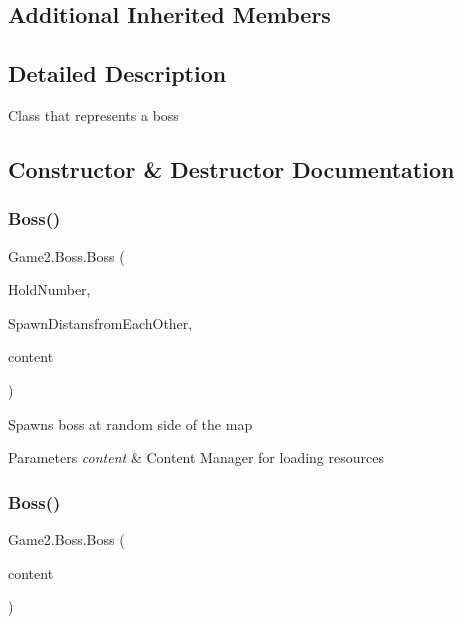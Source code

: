 \subsection*{Additional Inherited Members}


\subsection{Detailed Description}
Class that represents a boss 



\subsection{Constructor \& Destructor Documentation}
\mbox{\label{class_game2_1_1_boss_ae7aa8e138bbf3cc4ced004d6ef1f82df}} 
\subsubsection{\texorpdfstring{Boss()}{Boss()}\hspace{0.1cm}{\footnotesize\ttfamily [1/2]}}
{\footnotesize\ttfamily Game2.\+Boss.\+Boss (\begin{DoxyParamCaption}\item[{int}]{Hold\+Number,  }\item[{int}]{Spawn\+Distansfrom\+Each\+Other,  }\item[{Content\+Manager}]{content }\end{DoxyParamCaption})}



Spawns boss at random side of the map 


\begin{DoxyParams}{Parameters}
{\em content} & Content Manager for loading resources\\
\hline
\end{DoxyParams}
\mbox{\label{class_game2_1_1_boss_aec980cbbd476cb1b9dde1dd901f5d349}} 
\subsubsection{\texorpdfstring{Boss()}{Boss()}\hspace{0.1cm}{\footnotesize\ttfamily [2/2]}}
{\footnotesize\ttfamily Game2.\+Boss.\+Boss (\begin{DoxyParamCaption}\item[{Content\+Manager}]{content }\end{DoxyParamCaption})}



